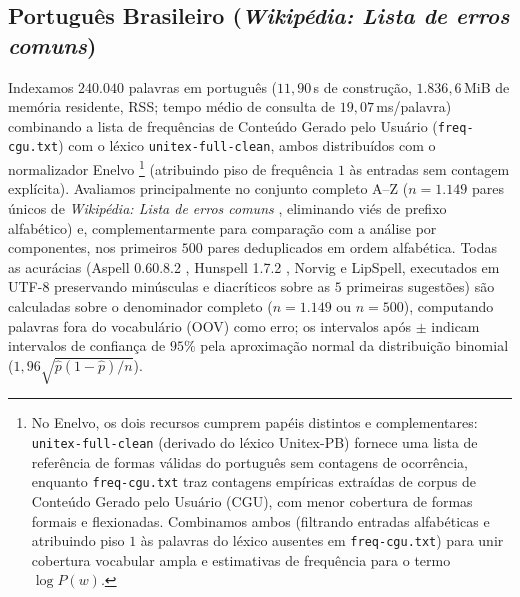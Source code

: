 \documentclass[a4paper, twocolumn, 11pt, twoside]{article}
\begin{document}
\subsection{Português Brasileiro (\textit{Wikipédia: Lista de erros comuns})}
\label{sec:pt_wiki}
Indexamos $240.040$ palavras em português ($11{,}90$\,s de construção, $1.836{,}6$\,MiB de memória residente, RSS; tempo médio de consulta de $19{,}07$\,ms/palavra) combinando a lista de frequências de Conteúdo Gerado pelo Usuário (\texttt{freq-cgu.txt}) com o léxico \texttt{unitex-full-clean}, ambos distribuídos com o normalizador Enelvo \citep{bertaglia2016enelvo}\footnote{No Enelvo, os dois recursos cumprem papéis distintos e complementares: \texttt{unitex-full-clean} (derivado do léxico Unitex-PB) fornece uma lista de referência de formas válidas do português sem contagens de ocorrência, enquanto \texttt{freq-cgu.txt} traz contagens empíricas extraídas de corpus de Conteúdo Gerado pelo Usuário (CGU), com menor cobertura de formas formais e flexionadas. Combinamos ambos (filtrando entradas alfabéticas e atribuindo piso $1$ às palavras do léxico ausentes em \texttt{freq-cgu.txt}) para unir cobertura vocabular ampla e estimativas de frequência para o termo $\log P(w)$.} (atribuindo piso de frequência $1$ às entradas sem contagem explícita). Avaliamos principalmente no conjunto completo A--Z ($n=1.149$ pares únicos de \textit{Wikipédia: Lista de erros comuns} \citep{wikipedia_erros_comuns}, eliminando viés de prefixo alfabético) e, complementarmente para comparação com a análise por componentes, nos primeiros $500$ pares deduplicados em ordem alfabética. Todas as acurácias (Aspell 0.60.8.2 \citep{atkinson_aspell}, Hunspell 1.7.2 \citep{nemeth_hunspell}, Norvig \citep{norvig2007spell} e LipSpell, executados em UTF-8 preservando minúsculas e diacríticos sobre as $5$ primeiras sugestões) são calculadas sobre o denominador completo ($n=1.149$ ou $n=500$), computando palavras fora do vocabulário (OOV) como erro; os intervalos após $\pm$ indicam intervalos de confiança de $95\%$ pela aproximação normal da distribuição binomial ($1{,}96\sqrt{\hat{p}(1-\hat{p})/n}$).
\end{document}
